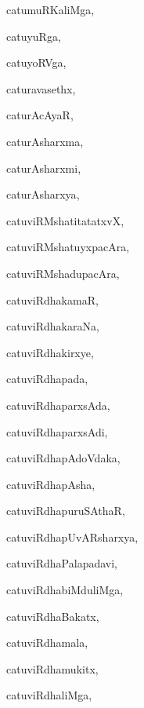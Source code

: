 \begin{multicols}{3}
{\noindent
{catumuRKaliMga}, \pageref{catumuRKaliMga}

\noindent
{catuyuRga}, \pageref{catuyuRga}

\noindent
{catuyoRVga}, \pageref{catuyoRVga}

\noindent
{caturavasethx}, \pageref{caturavasethx}

\noindent
{caturAcAyaR}, \pageref{caturAcAyaR}

\noindent
{caturAsharxma}, \pageref{caturAsharxma}

\noindent
{caturAsharxmi}, \pageref{caturAsharxmi}

\noindent
{caturAsharxya}, \pageref{caturAsharxya}

\noindent
{catuviRMshatitatatxvX}, \pageref{catuviRMshatitatatxvX}

\noindent
{catuviRMshatuyxpacAra}, \pageref{catuviRMshatuyxpacAra}

\noindent
{catuviRMshadupacAra}, \pageref{catuviRMshadupacAra}

\noindent
{catuviRdhakamaR}, \pageref{catuviRdhakamaR}

\noindent
{catuviRdhakaraNa}, \pageref{catuviRdhakaraNa}

\noindent
{catuviRdhakirxye}, \pageref{catuviRdhakirxye}

\noindent
{catuviRdhapada}, \pageref{catuviRdhapada}

\noindent
{catuviRdhaparxsAda}, \pageref{catuviRdhaparxsAda}

\noindent
{catuviRdhaparxsAdi}, \pageref{catuviRdhaparxsAdi}

\noindent
{catuviRdhapAdoVdaka}, \pageref{catuviRdhapAdoVdaka}

\noindent
{catuviRdhapAsha}, \pageref{catuviRdhapAsha}

\noindent
{catuviRdhapuruSAthaR}, \pageref{catuviRdhapuruSAthaR}

\noindent
{catuviRdhapUvARsharxya}, \pageref{catuviRdhapUvARsharxya}

\noindent
{catuviRdhaPalapadavi}, \pageref{catuviRdhaPalapadavi}

\noindent
{catuviRdhabiMduliMga}, \pageref{catuviRdhabiMduliMga}

\noindent
{catuviRdhaBakatx}, \pageref{catuviRdhaBakatx}

\noindent
{catuviRdhamala}, \pageref{catuviRdhamala}

\noindent
{catuviRdhamukitx}, \pageref{catuviRdhamukitx}

\noindent
{catuviRdhaliMga}, \pageref{catuviRdhaliMga}

}
\end{multicols}
